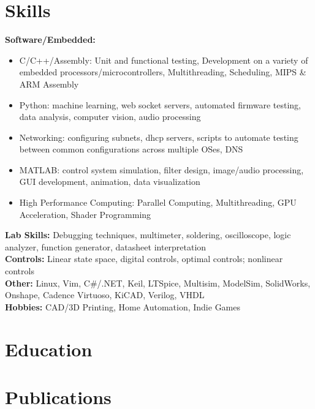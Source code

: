 \documentclass[11pt, a4paper]{article}
\begin{document}
\section*{Skills}
{\scriptsize
  \textbf{Software/Embedded:}
  \begin{itemize}[noitemsep] %
    \item C/C++/Assembly: Unit and functional testing, Development on a variety of embedded processors/microcontrollers, Multithreading, Scheduling, MIPS \& ARM Assembly
    \item Python: machine learning, web socket servers, automated firmware testing, data analysis, computer vision, audio processing
    \item Networking: configuring subnets, dhcp servers, scripts to automate testing between common configurations across multiple OSes, DNS
    \item MATLAB: control system simulation, filter design, image/audio processing, GUI development, animation, data visualization
    \item High Performance Computing: Parallel Computing, Multithreading, GPU Acceleration, Shader Programming
  \end{itemize}
  \textbf{Lab Skills:} Debugging techniques, multimeter, soldering, oscilloscope, logic analyzer, function generator, datasheet interpretation\\
  \textbf{Controls:} Linear state space, digital controls, optimal controls; nonlinear controls\\
  \textbf{Other:} Linux, Vim, C\#/.NET, Keil, LTSpice, Multisim, ModelSim, SolidWorks, Onshape, Cadence Virtuoso, KiCAD, Verilog, VHDL\\
  \textbf{Hobbies:} CAD/3D Printing, Home Automation, Indie Games\par\noindent
}

\section*{Education}
{\scriptsize
  \educationWithDuration
}

\section*{Publications}
{\scriptsize
  \publications
}

\end{document}
